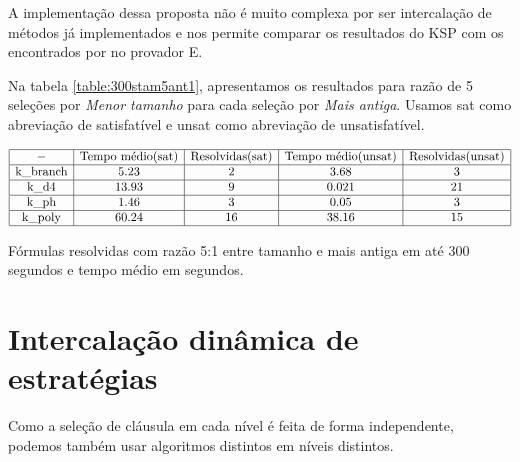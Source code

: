 A implementação dessa proposta não é muito complexa por ser intercalação de métodos já implementados e nos permite comparar os resultados do KSP com os encontrados por \cite{stephan} no provador E.


Na tabela \ref{table:300stam5ant1}, apresentamos os resultados para razão de 5 seleções por \textit{Menor tamanho} para cada seleção por \textit{Mais antiga}. Usamos sat como abreviação de satisfatível e unsat como abreviação de unsatisfatível.
\begin{table*}[t]
	\[
\begin{array}{|c|c|c|c|c|}
	\hline - & \textnormal{Tempo médio(sat)} & \textnormal{Resolvidas(sat)} & \textnormal{Tempo médio(unsat)} & \textnormal{Resolvidas(unsat)} \\
	
	\hline \textnormal{k\_branch} & 5.23 & 2 & 3.68 & 3 \\
	\hline \textnormal{k\_d4} & 13.93 & 9 & 0.021 & 21 \\
	\hline \textnormal{k\_ph} & 1.46 & 3 & 0.05 & 3 \\
	\hline \textnormal{k\_poly} & 60.24 & 16 & 38.16 & 15 \\
	
	\hline
	
\end{array}
	\]
\caption{Fórmulas resolvidas com razão 5:1 entre tamanho e mais antiga em até 300 segundos e tempo médio em segundos.}
\label{table:300stam5ant1}
\end{table*} %

\section{Intercalação dinâmica de estratégias}
Como a seleção de cláusula em cada nível é feita de forma independente, podemos também usar algoritmos distintos em níveis distintos.

